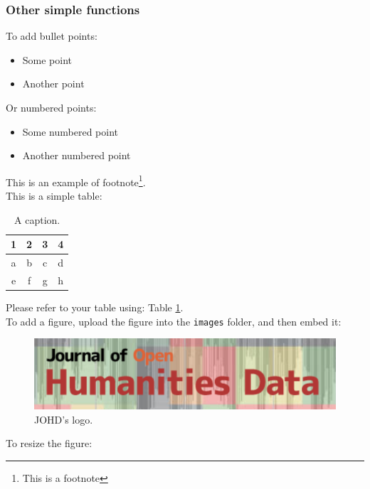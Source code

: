 \documentclass[11pt]{article}
\begin{document}
\subsubsection{Other simple functions}
To add bullet points:

\begin{itemize}
    \item Some point
    \item Another point
\end{itemize}

\noindent Or numbered points:

\begin{itemize}
    \item[1.] Some numbered point
    \item[2.] Another numbered point
\end{itemize}

\noindent This is an example of footnote\footnote{This is a footnote}. \\

\noindent This is a simple table:

\begin{table}[H]
\centering %
\caption{\label{tab1} A caption.}
\begin{tabular}{cccc}
\hline
1 & 2 & 3 & 4 \\
\hline
a & b & c & d\\
e & f & g & h\\
\hline
\end{tabular}
\end{table}

\noindent Please refer to your table using: Table \ref{tab1}.\\

\noindent To add a figure, upload the figure into the \texttt{images} folder, and then embed it:

\begin{figure}[H]
\centering
\includegraphics{images/image.jpg}
\caption{\label{fig1}JOHD's logo.}
\end{figure}

\noindent To resize the figure:
\end{document}
